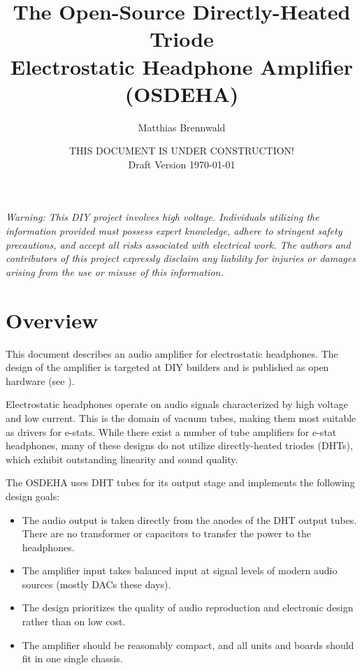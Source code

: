 





\title{The Open-Source Directly-Heated Triode \\ Electrostatic Headphone Amplifier \\ (OSDEHA)}
\author{Matthias Brennwald}
\date{THIS DOCUMENT IS UNDER CONSTRUCTION!\\ Draft Version \today}




\maketitle

\emph{Warning: This DIY project involves high voltage. Individuals utilizing the information provided must possess expert knowledge, adhere to stringent safety precautions, and accept all risks associated with electrical work. The authors and contributors of this project expressly disclaim any liability for injuries or damages arising from the use or misuse of this information.}


\section{Overview}

This document describes an audio amplifier for electrostatic headphones. The design of the amplifier is targeted at DIY builders and is published as open hardware (see ).

Electrostatic headphones operate on audio signals characterized by high voltage and low current. This is the domain of vacuum tubes, making them most suitable as drivers for e-stats.  While there exist a number of tube amplifiers for e-stat headphones, many of these designs do not utilize directly-heated triodes (DHTs), which exhibit outstanding linearity and sound quality.\par

The OSDEHA uses DHT tubes for its output stage and implements the following design goals:
\begin{itemize}
\item The audio output is taken directly from the anodes of the DHT output tubes. There are no transformer or capacitors to transfer the power to the headphones.
\item The amplifier input takes balanced input at signal levels of modern audio sources (mostly DACs these days).
\item The design prioritizes the quality of audio reproduction and electronic design rather than on low cost.
\item The amplifier should be reasonably compact, and all units and boards should fit in one single chassis.
\end{itemize}

